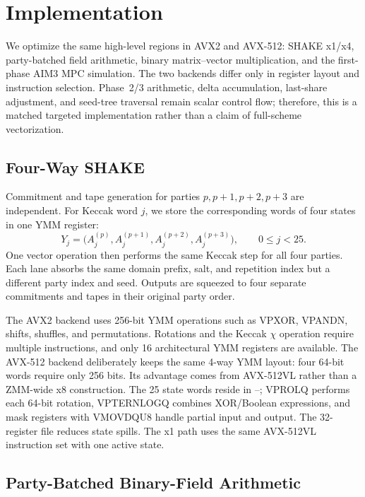 \section{Implementation}
\label{sec:impl}

We optimize the same high-level regions in AVX2 and AVX-512: SHAKE x1/x4,
party-batched field arithmetic, binary matrix--vector multiplication, and the
first-phase AIM3 MPC simulation.  The two backends differ only in register
layout and instruction selection.  Phase~2/3 arithmetic, delta accumulation,
last-share adjustment, and seed-tree traversal remain scalar control flow;
therefore, this is a matched targeted implementation rather than a claim of
full-scheme vectorization.

\subsection{Four-Way SHAKE}
\label{sec:shake}

Commitment and tape generation for parties $p,p+1,p+2,p+3$ are independent.
For Keccak word $j$, we store the corresponding words of four states in one
YMM register:
\begin{equation}
Y_j=\bigl(A_j^{(p)},A_j^{(p+1)},A_j^{(p+2)},A_j^{(p+3)}\bigr),
\qquad 0\le j<25.
\end{equation}
One vector operation then performs the same Keccak step for all four parties.
Each lane absorbs the same domain prefix, salt, and repetition index but a
different party index and seed.  Outputs are squeezed to four separate
commitments and tapes in their original party order.

The AVX2 backend uses 256-bit YMM operations such as VPXOR, VPANDN, shifts,
shuffles, and permutations.  Rotations and the Keccak $\chi$ operation require
multiple instructions, and only 16 architectural YMM registers are available.
The AVX-512 backend deliberately keeps the same 4-way YMM layout: four
64-bit words require only 256 bits.  Its advantage comes from AVX-512VL rather
than a ZMM-wide x8 construction.  The 25 state words reside in
--; VPROLQ performs each 64-bit rotation, VPTERNLOGQ
combines XOR/Boolean expressions, and mask registers with VMOVDQU8 handle
partial input and output.  The 32-register file reduces state spills.  The x1
path uses the same AVX-512VL instruction set with one active state.

\subsection{Party-Batched Binary-Field Arithmetic}
\label{sec:field}


